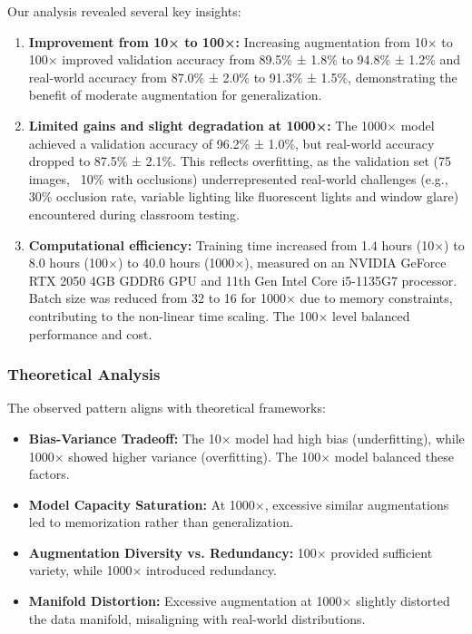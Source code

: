 \documentclass[conference]{IEEEtran}
\begin{document}
Our analysis revealed several key insights:

\begin{enumerate}
\item \textbf{Improvement from 10× to 100×:} Increasing augmentation from 10× to 100× improved validation accuracy from 89.5\% ± 1.8\% to 94.8\% ± 1.2\% and real-world accuracy from 87.0\% ± 2.0\% to 91.3\% ± 1.5\%, demonstrating the benefit of moderate augmentation for generalization.

\item \textbf{Limited gains and slight degradation at 1000×:} The 1000× model achieved a validation accuracy of 96.2\% ± 1.0\%, but real-world accuracy dropped to 87.5\% ± 2.1\%. This reflects overfitting, as the validation set (75 images, ~10\% with occlusions) underrepresented real-world challenges (e.g., 30\% occlusion rate, variable lighting like fluorescent lights and window glare) encountered during classroom testing.

\item \textbf{Computational efficiency:} Training time increased from 1.4 hours (10×) to 8.0 hours (100×) to 40.0 hours (1000×), measured on an NVIDIA GeForce RTX 2050 4GB GDDR6 GPU and 11th Gen Intel Core i5-1135G7 processor. Batch size was reduced from 32 to 16 for 1000× due to memory constraints, contributing to the non-linear time scaling. The 100× level balanced performance and cost.
\end{enumerate}

\subsubsection{Theoretical Analysis}
The observed pattern aligns with theoretical frameworks:

\begin{itemize}
\item \textbf{Bias-Variance Tradeoff:} The 10× model had high bias (underfitting), while 1000× showed higher variance (overfitting). The 100× model balanced these factors.
\item \textbf{Model Capacity Saturation:} At 1000×, excessive similar augmentations led to memorization rather than generalization.
\item \textbf{Augmentation Diversity vs. Redundancy:} 100× provided sufficient variety, while 1000× introduced redundancy.
\item \textbf{Manifold Distortion:} Excessive augmentation at 1000× slightly distorted the data manifold, misaligning with real-world distributions.
\end{itemize}
\end{document}
